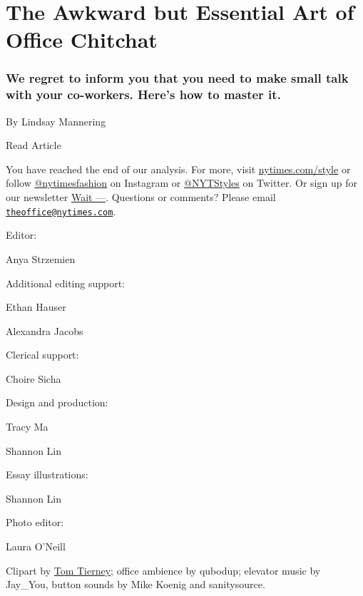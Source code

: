 \href{https://www.nytimes.com/2019/09/17/style/the-awkward-art-of-office-small-talk.html}{}

\hypertarget{the-awkward-but-essential-art-of-office-chitchat}{%
\section{The Awkward but Essential Art of Office
Chitchat}\label{the-awkward-but-essential-art-of-office-chitchat}}

\hypertarget{we-regret-to-inform-you-that-you-need-to-make-small-talk-with-your-co-workers-heres-how-to-master-it}{%
\subsubsection{We regret to inform you that you need to make small talk
with your co-workers. Here's how to master
it.}\label{we-regret-to-inform-you-that-you-need-to-make-small-talk-with-your-co-workers-heres-how-to-master-it}}

By Lindsay Mannering

Read Article

You have reached the end of our analysis. For more, visit
\href{https://www.nytimes.com/section/style}{nytimes.com/style} or
follow \href{https://www.instagram.com/nytimesfashion/}{@nytimesfashion}
on Instagram or \href{https://twitter.com/nytstyles}{@NYTStyles} on
Twitter. Or sign up for our newsletter
\href{https://www.nytimes.com/newsletters/wait}{Wait ---}. Questions or
comments? Please email
\href{mailto:theoffice@nytimes.com}{\nolinkurl{theoffice@nytimes.com}}.

Editor:

Anya Strzemien

Additional editing support:

Ethan Hauser

Alexandra Jacobs

Clerical support:

Choire Sicha

Design and production:

Tracy Ma

Shannon Lin

Essay illustrations:

Shannon Lin

Photo editor:

Laura O'Neill

Clipart by
\href{https://www.nytimes.com/2014/07/19/arts/tom-tierney-who-made-paper-dolls-an-art-form-dies-at-85.html}{Tom
Tierney}; office ambience by qubodup; elevator music by Jay\_You, button
sounds by Mike Koenig and sanitysource.

